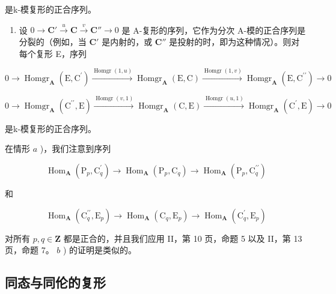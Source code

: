 是k-模复形的正合序列。

\begin{enumerate}
\def\labelenumi{\alph{enumi})}
\setcounter{enumi}{1}
\tightlist
\item
  设 \(0 \to \mathbf{C}' \xrightarrow{u} \mathbf{C} \xrightarrow{v} \mathbf{C}'' \to 0\) 是 A-复形的序列，它作为分次 A-模的正合序列是分裂的（例如，当 \(\mathbf{C}'\) 是内射的，或 \(\mathbf{C}''\) 是投射的时，即为这种情况）。则对每个复形 E，序列
\end{enumerate}

\[
0 \rightarrow \operatorname{Homgr} _ {\mathbf {A}} (\mathrm{E}, \mathrm{C} ^ {\prime}) \xrightarrow {\operatorname{Homgr} (1 , u)} \operatorname{Homgr} _ {\mathbf {A}} (\mathrm{E}, \mathrm{C}) \xrightarrow {\operatorname{Homgr} (1 , v)} \operatorname{Homgr} _ {\mathbf {A}} (\mathrm{E}, \mathrm{C} ^ {\prime \prime}) \rightarrow 0
\]

\[
0 \rightarrow \operatorname{Homgr} _ {\mathbf {A}} \left(\mathrm{C} ^ {\prime \prime}, \mathrm{E}\right) \xrightarrow {\operatorname{Homgr} (v , 1)} \operatorname{Homgr} _ {\mathbf {A}} (\mathrm{C}, \mathrm{E}) \xrightarrow {\operatorname{Homgr} (u , 1)} \operatorname{Homgr} _ {\mathbf {A}} \left(\mathrm{C} ^ {\prime}, \mathrm{E}\right)\rightarrow 0
\]

是k-模复形的正合序列。

在情形 \(a\) )，我们注意到序列

\[
\operatorname{Hom} _ {\mathbf {A}} \left(\mathrm{P} _ {p}, \mathrm{C} _ {q} ^ {\prime}\right)\rightarrow \operatorname{Hom} _ {\mathbf {A}} \left(\mathrm{P} _ {p}, \mathrm{C} _ {q}\right)\rightarrow \operatorname{Hom} _ {\mathbf {A}} \left(\mathrm{P} _ {p}, \mathrm{C} _ {q} ^ {\prime \prime}\right)
\]

和

\[
\operatorname{Hom} _ {\mathbf {A}} \left(\mathrm{C} _ {q} ^ {\prime \prime}, \mathrm{E} _ {p}\right)\rightarrow \operatorname{Hom} _ {\mathbf {A}} \left(\mathrm{C} _ {q}, \mathrm{E} _ {p}\right)\rightarrow \operatorname{Hom} _ {\mathbf {A}} \left(\mathrm{C} _ {q} ^ {\prime}, \mathrm{E} _ {p}\right)
\]

对所有 \(p, q \in \mathbf{Z}\) 都是正合的，并且我们应用 II，第 10 页，命题 5 以及 II，第 13 页，命题 7。 \(b\) ) 的证明是类似的。

\subsection{同态与同伦的复形}

